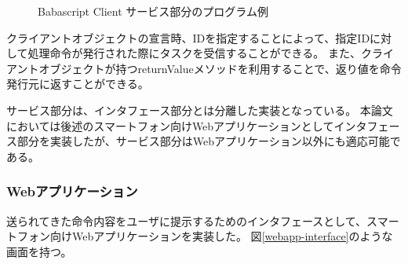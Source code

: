 \documentclass[twoside]{wiss}
\begin{document}
\begin{figure}[!h]  
  \centering
  \caption{Babascript Client サービス部分のプログラム例}
  \label{client_library}
\end{figure}

クライアントオブジェクトの宣言時、IDを指定することによって、指定IDに対して処理命令が発行された際にタスクを受信することができる。
また、クライアントオブジェクトが持つreturnValueメソッドを利用することで、返り値を命令発行元に返すことができる。

サービス部分は、インタフェース部分とは分離した実装となっている。
本論文においては後述のスマートフォン向けWebアプリケーションとしてインタフェース部分を実装したが、サービス部分はWebアプリケーション以外にも適応可能である。

\subsubsection{Webアプリケーション}

送られてきた命令内容をユーザに提示するためのインタフェースとして、スマートフォン向けWebアプリケーションを実装した。
図\ref{webapp-interface}のような画面を持つ。
\end{document}
